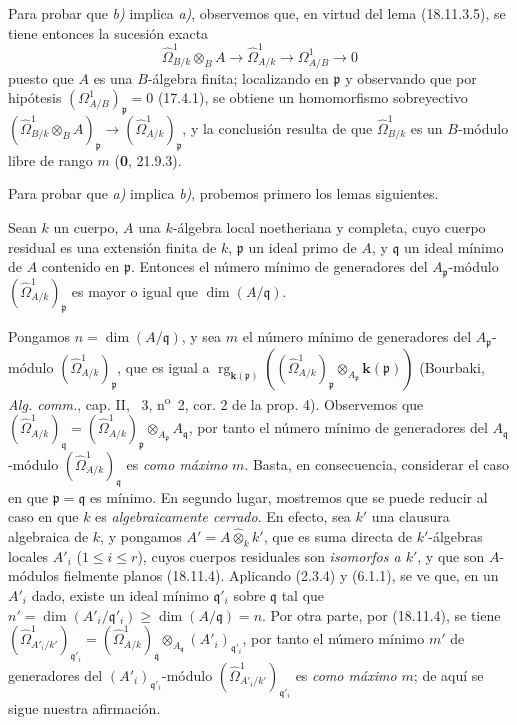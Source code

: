 Para probar que \emph{b)} implica \emph{a)}, observemos que, en virtud del lema (18.11.3.5), se tiene entonces la sucesión exacta
\[
  \hat{\Omega}^1_{B/k}\otimes_B A\longrightarrow\hat{\Omega}^1_{A/k}\longrightarrow\Omega^1_{A/B}\longrightarrow0
\]
puesto que $A$ es una $B$-álgebra finita; localizando en $\mathfrak p$ y observando que por hipótesis $(\Omega^1_{A/B})_{\mathfrak p}=0$ (17.4.1), se obtiene un homomorfismo sobreyectivo $(\hat{\Omega}^1_{B/k}\otimes_B A)_{\mathfrak p}\to(\hat{\Omega}^1_{A/k})_{\mathfrak p}$, y la conclusión resulta de que $\hat{\Omega}^1_{B/k}$ es un $B$-módulo libre de rango $m$ (\textbf 0, 21.9.3).

Para probar que \emph{a)} implica \emph{b)}, probemos primero los lemas siguientes.

\begin{lemma}[18.11.5.1]
\label{IV.18.11.5.1}
Sean $k$ un cuerpo, $A$ una $k$-álgebra local noetheriana y completa, cuyo cuerpo residual es una extensión finita de $k$, $\mathfrak p$ un ideal primo de $A$, y $\mathfrak q$ un ideal mínimo de $A$ contenido en $\mathfrak p$. Entonces el número mínimo de generadores del $A_{\mathfrak p}$-módulo $(\hat{\Omega}^1_{A/k})_{\mathfrak p}$ es mayor o igual que $\dim(A/\mathfrak q)$.
\end{lemma}


Pongamos $n=\dim(A/\mathfrak q)$, y sea $m$ el número mínimo de generadores del $A_{\mathfrak p}$-módulo $(\hat{\Omega}^1_{A/k})_{\mathfrak p}$, que es igual a $\operatorname{rg}_{\mathbf{k}(\mathfrak p)}((\hat{\Omega}^1_{A/k})_{\mathfrak p}\otimes_{A_{\mathfrak p}}\boldsymbol{k}(\mathfrak p))$ (Bourbaki, \emph{Alg. comm.}, cap. II, \textsection~3, n\textsuperscript{o}~2, cor. 2 de la prop. 4). Observemos que $(\hat{\Omega}^1_{A/k})_{\mathfrak q}=(\hat{\Omega}^1_{A/k})_{\mathfrak p}\otimes_{A_{\mathfrak p}}A_{\mathfrak q}$, por tanto el número mínimo de generadores del $A_{\mathfrak q}$-módulo $(\hat{\Omega}^1_{A/k})_{\mathfrak q}$ es \emph{como máximo} $m$. Basta, en consecuencia, considerar el caso en que $\mathfrak p=\mathfrak q$ es mínimo. En segundo lugar, mostremos que se puede reducir al caso en que $k$ es \emph{algebraicamente cerrado}. En efecto, sea $k'$ una clausura algebraica de $k$, y pongamos $A'=A\widehat{\otimes}_k k'$, que es suma directa de $k'$-álgebras locales $A'_i$ ($1\leq i\leq r$), cuyos cuerpos residuales son \emph{isomorfos a $k'$}, y que son $A$-módulos fielmente planos (18.11.4). Aplicando (2.3.4) y (6.1.1), se ve que, en un $A'_i$ dado, existe un ideal mínimo $\mathfrak q'_i$ sobre $\mathfrak q$ tal que $n'=\dim(A'_i/\mathfrak q'_i)\geq\dim(A/\mathfrak q)=n$. Por otra parte, por (18.11.4), se tiene $(\hat{\Omega}^1_{A'_i/k'})_{\mathfrak q'_i}=(\hat{\Omega}^1_{A/k})_{\mathfrak q}\otimes_{A_{\mathfrak q}}(A'_i)_{\mathfrak q'_i}$, por tanto el número mínimo $m'$ de generadores del $(A'_i)_{\mathfrak q'_i}$-módulo $(\hat{\Omega}^1_{A'_i/k'})_{\mathfrak q'_i}$ es \emph{como máximo $m$}; de aquí se sigue nuestra afirmación.

